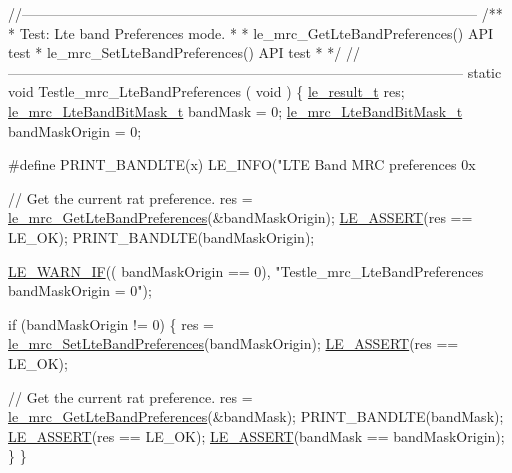 \begin{DoxyCodeInclude}
{\textcolor{comment}{//--------------------------------------------------------------------------------------------------}\textcolor{comment}{}
\textcolor{comment}{/**}
\textcolor{comment}{ * Test: Lte band Preferences mode.}
\textcolor{comment}{ *}
\textcolor{comment}{ * le\_mrc\_GetLteBandPreferences() API test}
\textcolor{comment}{ * le\_mrc\_SetLteBandPreferences() API test}
\textcolor{comment}{ *}
\textcolor{comment}{ */}
\textcolor{comment}{//--------------------------------------------------------------------------------------------------}
\textcolor{keyword}{static} \textcolor{keywordtype}{void} Testle\_mrc\_LteBandPreferences
(
    \textcolor{keywordtype}{void}
)
\{
    \hyperlink{le__basics_8h_a1cca095ed6ebab24b57a636382a6c86c}{le\_result\_t} res;
    \hyperlink{le__mrc__interface_8h_a81d705d61ee7ee56eab6aafb1af92579}{le\_mrc\_LteBandBitMask\_t} bandMask = 0;
    \hyperlink{le__mrc__interface_8h_a81d705d61ee7ee56eab6aafb1af92579}{le\_mrc\_LteBandBitMask\_t} bandMaskOrigin = 0;

\textcolor{preprocessor}{#define  PRINT\_BANDLTE(x)   LE\_INFO("LTE Band MRC preferences 0x%

    \textcolor{comment}{// Get the current rat preference.}
    res = \hyperlink{le__mrc__interface_8h_af4ec5bd36ba8df68bc12a10618268742}{le\_mrc\_GetLteBandPreferences}(&bandMaskOrigin);
    \hyperlink{le__log_8h_ac0dbbef91dc0fed449d0092ff0557b39}{LE\_ASSERT}(res == LE\_OK);
    PRINT\_BANDLTE(bandMaskOrigin);

    \hyperlink{le__log_8h_a8d8f204806cd5fc0455fe3caacf1d251}{LE\_WARN\_IF}(( bandMaskOrigin == 0), \textcolor{stringliteral}{"Testle\_mrc\_LteBandPreferences bandMaskOrigin = 0"});

    \textcolor{keywordflow}{if} (bandMaskOrigin != 0)
    \{
        res = \hyperlink{le__mrc__interface_8h_a21d2fe7c736e9a4a342dcc461a5d6e02}{le\_mrc\_SetLteBandPreferences}(bandMaskOrigin);
        \hyperlink{le__log_8h_ac0dbbef91dc0fed449d0092ff0557b39}{LE\_ASSERT}(res == LE\_OK);

        \textcolor{comment}{// Get the current rat preference.}
        res = \hyperlink{le__mrc__interface_8h_af4ec5bd36ba8df68bc12a10618268742}{le\_mrc\_GetLteBandPreferences}(&bandMask);
        PRINT\_BANDLTE(bandMask);
        \hyperlink{le__log_8h_ac0dbbef91dc0fed449d0092ff0557b39}{LE\_ASSERT}(res == LE\_OK);
        \hyperlink{le__log_8h_ac0dbbef91dc0fed449d0092ff0557b39}{LE\_ASSERT}(bandMask == bandMaskOrigin);
    \}
\}


}}
\end{DoxyCodeInclude}
